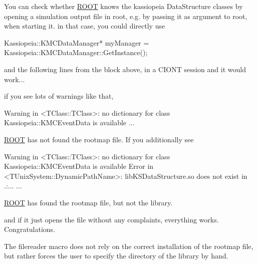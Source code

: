 You can check whether \hyperlink{namespace_r_o_o_t}{ROOT} knows the kassiopeia DataStructure classes by opening a simulation output file in root, e.g. by passing it as argument to root, when starting it. in that case, you could directly use 
\begin{DoxyCode}
    Kassiopeia::KMCDataManager* myManager = 
      Kassiopeia::KMCDataManager::GetInstance();
\end{DoxyCode}
 and the following lines from the block above, in a CIONT session and it would work...

if you see lots of warnings like that, 
\begin{DoxyCode}
Warning in <TClass::TClass>: no dictionary for class Kassiopeia::KMCEventData is 
      available
...
\end{DoxyCode}
 \hyperlink{namespace_r_o_o_t}{ROOT} has not found the rootmap file. If you additionally see 
\begin{DoxyCode}
Warning in <TClass::TClass>: no dictionary for class Kassiopeia::KMCEventData is 
      available
Error in <TUnixSystem::DynamicPathName>: libKSDataStructure.so does not exist in 
      .:...
...
\end{DoxyCode}
 \hyperlink{namespace_r_o_o_t}{ROOT} has found the rootmap file, but not the library.

and if it just opens the file without any complaints, everything works. Congratulations.

The filereader macro does not rely on the correct installation of the rootmap file, but rather forces the user to specify the directory of the library by hand. 
